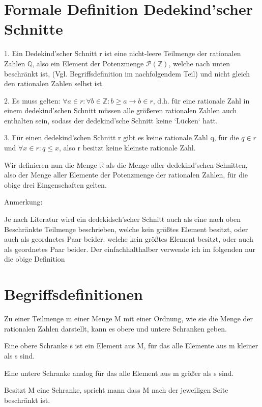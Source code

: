 \documentclass[12pt]{article}
\begin{document}
    \section{Formale Definition Dedekind'scher Schnitte}

    1. Ein Dedekind'scher Schnitt r ist eine nicht-leere Teilmenge der rationalen Zahlen $\mathbb{Q}$,
    also ein Element der Potenzmenge $\mathcal{P}(\mathbb{Z})$, welche nach unten beschränkt ist,
    (Vgl. Begriffsdefinition im nachfolgendem Teil) und nicht gleich den rationalen Zahlen selbst ist.

    2. Es muss gelten: $\forall a \in r: \forall b \in \mathbb{Z}: b \ge a \rightarrow b \in r$, d.h.
    für eine rationale Zahl in einem dedekind'schen Schnitt müssen alle größeren rationalen Zahlen auch enthalten sein,
    sodass der dedekind'sche Schnitt keine `Lücken` hatt.

    3. Für einen dedekind'schen Schnitt r gibt es keine rationale Zahl q, für die $q \in r$ und $\forall x \in r: q \le x$,
    also r besitzt keine kleinste rationale Zahl.

    Wir definieren nun die Menge $\mathbb{R}$ als die Menge aller dedekind'schen Schnitten, also der Menge aller
    Elemente der Potenzmenge der rationalen Zahlen, für die obige drei Eingenschaften gelten.

    Anmerkung:

    Je nach Literatur wird ein dedekidsch'scher Schnitt auch als eine nach oben Beschränkte Teilmenge beschrieben,
    welche kein größtes Element besitzt, oder auch als geordnetes Paar beider.
    welche kein größtes Element besitzt, oder auch als geordnetes Paar beider. Der einfachhalthalber
    verwende ich im folgenden nur die obige Definition

    \section{Begriffsdefinitionen}

    Zu einer Teilmenge m einer Menge M mit einer Ordnung, wie sie die Menge der rationalen Zahlen darstellt,
    kann es obere und untere Schranken geben.

    Eine obere Schranke s ist ein Element aus M, für das alle Elemente aus m kleiner als s sind.

    Eine untere Schranke analog für das alle Element aus m größer als s sind.

    Besitzt M eine Schranke, spricht mann dass M nach der jeweiligen Seite beschränkt ist.
\end{document}
